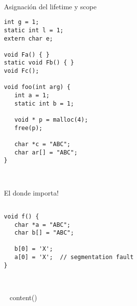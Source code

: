 ~%
\begin{frame}[fragile]{Asignaci\'on del lifetime y scope}
         \begin{lstlisting}[style=normal]
int g = 1;
static int l = 1;
extern char e;

void Fa() { }
static void Fb() { }
void Fc();

void foo(int arg) {
   int a = 1;
   static int b = 1;

   void * p = malloc(4);
   free(p);

   char *c = "ABC";
   char ar[] = "ABC";
}
         \end{lstlisting}
\end{frame}
~%
\begin{frame}[fragile]{El donde importa!}
         \begin{lstlisting}[style=normal]

void f() {
   char *a = "ABC";
   char b[] = "ABC";

   b[0] = 'X';
   a[0] = 'X';  // segmentation fault
}
         \end{lstlisting}
\end{frame}

~%

~{ content() }~





